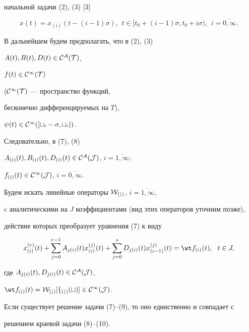 начальной задачи (2), (3) [3]


$$


x(t)=x_{(i)}(t-(i-1)\sigma), \ \ t \in [t_0+(i-1)\sigma, t_0+i \sigma),


\ \ i=\overline{0,\infty}.


$$





В дальнейшем будем предполагать, что в (2), (3)


$A(t),B(t),D(t) \in \cal C^A(T)$,


$f(t) \in \cal C^{\infty}(T)$


($\cal C^{\infty }(T)$ --- пространство функций,


бесконечно дифференцируемых на $T$),


$\psi (t) \in \cal C^{\infty}([t_0-\sigma, t_0))$.


Следовательно, в (7), (8)


$A_{(i)}(t),B_{(i)}(t),D_{(i)}(t) \in \cal C^A(J)$, $i=\overline{1,\infty}$;


$f_{(i)}(t)\in \cal C^{\infty}(J)$, $i=\overline{0,\infty}$.





Будем искать линейные операторы $\cal W_{(i)}$, $i=\overline{1,\infty}$,


c аналитическими на $J$ коэффициентами (вид этих операторов уточним позже),


действие которых преобразует уравнения (7) к виду


\begin{equation}


x_{(i)}^{(r)}(t)+\sum_{j=0}^{r-1}{A_{j(i)}(t)x_{(i)}^{(j)}(t)}+


\sum_{j=0}^{s}{D_{j(i)}(t)x_{(i-1)}^{(j)}(t)}=\wt f_{(i)}(t),


\ \  t \in J,


\end{equation}


где $A_{j(i)}(t),D_{j(i)}(t) \in \cal C^A(J)$,


$\wt f_{(i)}(t)=\cal W_{(i)}[f_{(i)}(t)] \in \cal C^{\infty }(J)$.





Если существует решение задачи (7)--(9), то оно единственно и совпадает с


решением краевой задачи (8)--(10).





